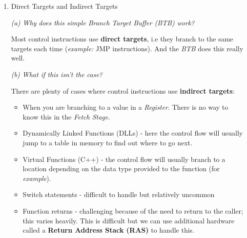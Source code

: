 \documentclass[12pt]{article}
\newenvironment{QandA}{\begin{enumerate}[label=\bfseries\alph*.]\bfseries}
                      {\end{enumerate}}
\newenvironment{answered}{\par\quad\normalfont}{}
\begin{document}
\begin{QandA}
\begin{answered}
To avoid this situation, an additional \textbf{tag field} is introduced which associates a given \textit{Branch Target Buffer (BTB)} entry with a particular \textit{Program Counter (PC)}, which is used to tag that particular branching instruction. 

During the actual \textbf{\textit{BTB} update}, this will look like:
\begin{equation*}
\begin{split}
    BTB[PC].tag = & \ PC \\
    BTB[PC].target = & \ \text{target of branch} 
\end{split}
\end{equation*}

And at the \textbf{\textit{BTB} prediction step} in the \textit{Fetch Stage}, this will look like:
\begin{equation*}
    \begin{split}
        Predicted\ PC\ = (BTB[PC].tag == PC)\ ?\ BTB[PC].target\ :\ PC + 4
    \end{split}
\end{equation*}
\end{answered}
\vspace{-0.8cm}

\item Direct Targets and Indirect Targets
\begin{answered}
\textit{(a) Why does this simple \textit{Branch Target Buffer (BTB)} work?}

Most control instructions use \textbf{direct targets}, i.e they branch to the same targets each time (\textit{example:} JMP instructions). And the \textit{BTB} does this really well.

\qquad \textit{(b) What if this isn't the case?}

There are plenty of cases where control instructions use \textbf{indirect targets}:
\begin{itemize}
    \item When you are branching to a value in a \textit{Register}. There is no way to know this in the \textit{Fetch Stage}.
    \item Dynamically Linked Functions (DLLs) - here the control flow will usually jump to a table in memory to find out where to go next.
    \item Virtual Functions (C++) - the control flow will usually branch to a location depending on the data type provided to the function (for \textit{example}).
    \item Switch statements - difficult to handle but relatively uncommon
    \item Function returns - challenging because of the need to return to the caller; this varies heavily. This is difficult but we can use additional hardware called a \textbf{Return Address Stack (RAS)} to handle this.
\end{itemize}
\end{answered}


\end{QandA}
\end{document}
